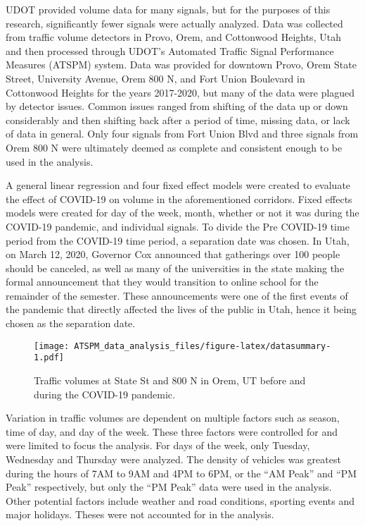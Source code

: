 \documentclass[3p, authoryear]{elsarticle} %
\begin{document}
UDOT provided volume data for many signals, but for the purposes of this research, significantly fewer signals were actually analyzed. Data was collected from traffic volume detectors in Provo, Orem, and Cottonwood Heights, Utah and then processed through UDOT's Automated Traffic Signal Performance Measures (ATSPM) system. Data was provided for downtown Provo, Orem State Street, University Avenue, Orem 800 N, and Fort Union Boulevard in Cottonwood Heights for the years 2017-2020, but many of the data were plagued by detector issues. Common issues ranged from shifting of the data up or down considerably and then shifting back after a period of time, missing data, or lack of data in general. Only four signals from Fort Union Blvd and three signals from Orem 800 N were ultimately deemed as complete and consistent enough to be used in the analysis.

A general linear regression and four fixed effect models were created to evaluate the effect of COVID-19 on volume in the aforementioned corridors. Fixed effects models were created for day of the week, month, whether or not it was during the COVID-19 pandemic, and individual signals. To divide the Pre COVID-19 time period from the COVID-19 time period, a separation date was chosen. In Utah, on March 12, 2020, Governor Cox announced that gatherings over 100 people should be canceled, as well as many of the universities in the state making the formal announcement that they would transition to online school for the remainder of the semester. These announcements were one of the first events of the pandemic that directly affected the lives of the public in Utah, hence it being chosen as the separation date.

\begin{figure}
\centering
\texttt{[image: ATSPM\_data\_analysis\_files/figure-latex/datasummary-1.pdf]}
\caption{\label{fig:datasummary}Traffic volumes at State St and 800 N in Orem, UT before and during the COVID-19 pandemic.}
\end{figure}

Variation in traffic volumes are dependent on multiple factors such as season, time of day, and day of the week. These three factors were controlled for and were limited to focus the analysis. For days of the week, only Tuesday, Wednesday and Thursday were analyzed. The density of vehicles was greatest during the hours of 7AM to 9AM and 4PM to 6PM, or the ``AM Peak'' and ``PM Peak'' respectively, but only the ``PM Peak'' data were used in the analysis. Other potential factors include weather and road conditions, sporting events and major holidays. Theses were not accounted for in the analysis.
\end{document}
